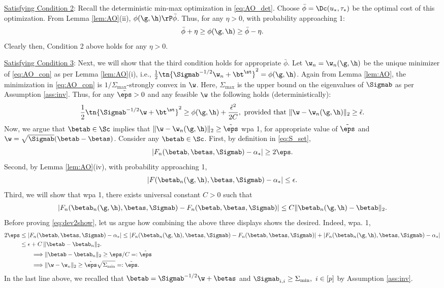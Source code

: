 \vspace{5pt}
\noindent\underline{Satisfying Condition 2}: Recall the deterministic min-max optimization in \eqref{eq:AO_det}. Choose $\bar\phi=\Dc(u_*,\tau_*)$ be the optimal cost of this optimization. From Lemma \ref{lem:AO}(ii), $\phi(\g,\h)\rP\bar\phi$. Thus, for any $\eta>0$, with probability approaching 1:
\begin{align}\label{eq:phi_lim}
\bar\phi + \eta \geq \phi(\g,\h) \geq \bar\phi - \eta.
\end{align}
Clearly then, Condition 2 above holds for any $\eta>0$. 

\vspace{5pt}
\noindent\underline{Satisfying Condition 3}: Next, we will show that the third condition holds for appropriate $\bar\phi$. 
Let $\w_n=\w_n(\g,\h)$ be the unique minimizer of \eqref{eq:AO_con} as per Lemma \ref{lem:AO}(i), i.e., $\frac{1}{2}\tn{\Sigmab^{-1/2}\w_n+\bt^\st}^2 = \phi(\g,\h)$. Again from Lemma \ref{lem:AO}, the minimization in \eqref{eq:AO_con} is $1/\Sigma_{\max}$-strongly convex in $\w$. Here, $\Sigma_{\max}$ is the upper bound on the eigenvalues of $\Sigmab$ as per Assumption \ref{ass:inv}. Thus, for any $\tilde\eps>0$ and any feasible $\w$ the following holds (deterministically):
\begin{align}\label{eq:sc}
\frac{1}{2}\tn{\Sigmab^{-1/2}\w+\bt^\st}^2 \geq \phi(\g,\h) + \frac{\tilde\epsilon^2}{2C},~\text{provided that}~ \|\w-\w_n(\g,\h)\|_2 \geq \tilde\epsilon.
\end{align}
Now, we argue that $\betab\in\Sc$ implies that $\|\w-\w_n(\g,\h)\|_2\geq \tilde\eps$ wpa 1, for 
appropriate value of $\tilde\eps$ and $\w=\sqrt{\Sigmab}(\betab-\betas)$. Consider any $\betab\in\Sc$. First, by definition in \eqref{eq:S_set},
$$
|F_n(\betab,\betas,\Sigmab)-\alpha_*| \geq 2\eps.
$$
Second, by Lemma \ref{lem:AO}(iv), with probability approaching 1,
$$
|F(\betab_n(\g,\h),\betas,\Sigmab) - \alpha_*| \leq \epsilon.
$$
Third, we will show that wpa 1, there exists universal constant $C>0$ such that
\begin{align}
|F_n(\betab_n(\g,\h),\betas,\Sigmab) - F_n(\betab,\betas,\Sigmab)| \leq C {\|\betab_{n}(\g,\h) - \betab\|_2}\label{eq:dev2show}.
\end{align}
Before proving \eqref{eq:dev2show}, let us argue how combining the above three displays shows the desired. Indeed, wpa. 1,
\begin{align*}
2\eps &\leq |F_n(\betab,\betas,\Sigmab)-\alpha_*| \leq |F_n(\betab_n(\g,\h),\betas,\Sigmab) - F_n(\betab,\betas,\Sigmab)| + |F_n(\betab_n(\g,\h),\betas,\Sigmab) - \alpha_*| \\
&\leq \epsilon + C \,\|\betab-\betab_n\|_2. \\
&\qquad\Longrightarrow \|\betab-\betab_n\|_2 \geq {\eps}/{C}=:\hat\eps\\
&\qquad\Longrightarrow \|\w-\w_n\|_2 \geq \hat\eps\sqrt{\Sigma_{\min}}=:\tilde\eps.
\end{align*}
In the last line above, we recalled that $\betab=\Sigmab^{-1/2}\w+\betas$ and $\Sigmab_{i,i}\geq\Sigma_{\min},~i\in[p]$ by Assumption \ref{ass:inv}.

